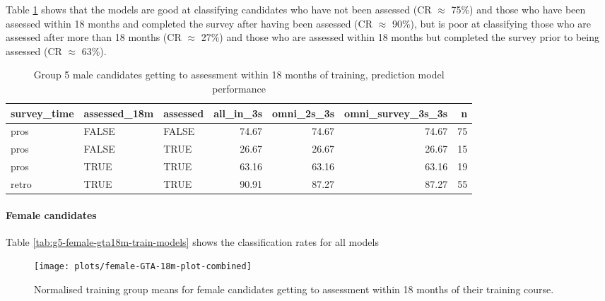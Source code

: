 \documentclass[a4paper,]{book}
\let\oldparagraph\paragraph
\renewcommand{\paragraph}[1]{\oldparagraph{#1}\mbox{}}
\begin{document}
Table \ref{tab:g5-male-GTA-18m-pred-perform} shows that the models are good at classifying candidates who have not been assessed (CR \(\approx\) 75\%) and those who have been assessed within 18 months and completed the survey after having been assessed (CR \(\approx\) 90\%), but is poor at classifying those who are assessed after more than 18 months (CR \(\approx\) 27\%) and those who are assessed within 18 months but completed the survey prior to being assessed (CR \(\approx\) 63\%).

\begin{table}

\caption{\label{tab:g5-male-GTA-18m-pred-perform}Group 5 male candidates getting to assessment within 18 months of training, prediction model performance}
\centering
\begin{tabular}[t]{lllrrrr}
\toprule
survey\_time & assessed\_18m & assessed & all\_in\_3s & omni\_2s\_3s & omni\_survey\_3s\_3s & n\\
\midrule
pros & FALSE & FALSE & 74.67 & 74.67 & 74.67 & 75\\
pros & FALSE & TRUE & 26.67 & 26.67 & 26.67 & 15\\
pros & TRUE & TRUE & 63.16 & 63.16 & 63.16 & 19\\
retro & TRUE & TRUE & 90.91 & 87.27 & 87.27 & 55\\
\bottomrule
\end{tabular}
\end{table}

\hypertarget{female-candidates}{%
\paragraph{Female candidates}\label{female-candidates}}

Table \ref{tab:g5-female-gta18m-train-models} shows the classification rates for all models

\begin{figure}
\texttt{[image: plots/female-GTA-18m-plot-combined]} \caption{Normalised training group means for female candidates getting to assessment within 18 months of their training course.}\label{fig:female-GTA-18m-plot-combined}
\end{figure}
\end{document}

